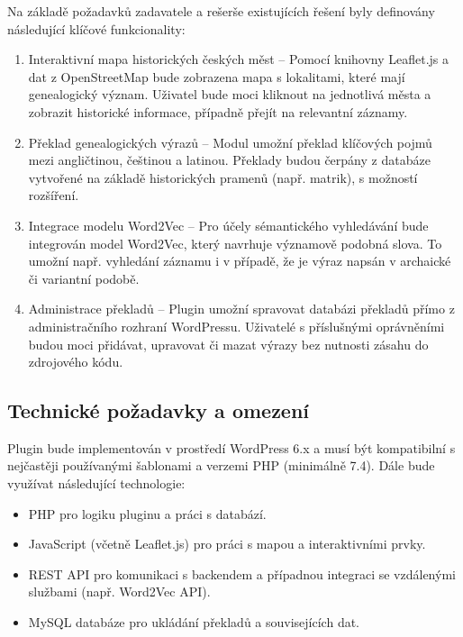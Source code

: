 \documentclass[czech, ba, kiv, he]{fasthesis}
\begin{document}
Na základě požadavků zadavatele a rešerše existujících řešení byly definovány následující klíčové funkcionality:

\begin{enumerate}
 \item Interaktivní mapa historických českých měst – Pomocí knihovny Leaflet.js a dat z OpenStreetMap bude zobrazena mapa s lokalitami, které mají genealogický význam. Uživatel bude moci kliknout na jednotlivá města a zobrazit historické informace, případně přejít na relevantní záznamy.


\item Překlad genealogických výrazů – Modul umožní překlad klíčových pojmů mezi angličtinou, češtinou a latinou. Překlady budou čerpány z databáze vytvořené na základě historických pramenů (např. matrik), s možností rozšíření.

\item Integrace modelu Word2Vec – Pro účely sémantického vyhledávání bude integrován model Word2Vec, který navrhuje významově podobná slova. To umožní např. vyhledání záznamu i v případě, že je výraz napsán v archaické či variantní podobě.

\item Administrace překladů – Plugin umožní spravovat databázi překladů přímo z administračního rozhraní WordPressu. Uživatelé s příslušnými oprávněními budou moci přidávat, upravovat či mazat výrazy bez nutnosti zásahu do zdrojového kódu.
\end{enumerate}

\subsection{Technické požadavky a omezení}

Plugin bude implementován v prostředí WordPress 6.x a musí být kompatibilní s nejčastěji používanými šablonami a verzemi PHP (minimálně 7.4). Dále bude využívat následující technologie:

\begin{itemize} 
\item PHP pro logiku pluginu a práci s databází. 
\item JavaScript (včetně Leaflet.js) pro práci s mapou a interaktivními prvky. 
\item REST API pro komunikaci s backendem a případnou integraci se vzdálenými službami (např. Word2Vec API). 
\item MySQL databáze pro ukládání překladů a souvisejících dat. 
\end{itemize}
\end{document}
